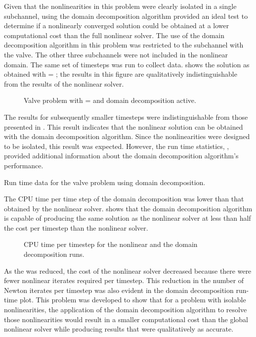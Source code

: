 Given that the nonlinearities in this problem were clearly isolated in a single subchannel, using the domain decomposition algorithm provided an ideal test to determine if a nonlinearly converged solution could be obtained at a lower computational cost than the full nonlinear solver.
The use of the domain decomposition algorithm in this problem was restricted to the subchannel with the valve.
The other three subchannels were not included in the nonlinear domain.
The same set of timesteps was run to collect data.
 shows the solution as obtained with \dtmax{} = ; the results in this figure are qualitatively indistinguishable from the results of the nonlinear solver.

\begin{figure}[h!tb]
\centering

\caption{Valve problem with \dtmax{} =  and domain decomposition active.}
\label{fig:valveDom6pt25em02}
\end{figure}

The results for subsequently smaller timesteps were indistinguishable from those presented in .
This result indicates that the nonlinear solution can be obtained with the domain decomposition algorithm.
Since the nonlinearities were designed to be isolated, this result was expected.
However, the run time statistics, , provided additional information about the domain decomposition algorithm's performance.

\begin{table}[h!tb]
\centering
\singlespace

\caption{Run time data for the valve problem using domain decomposition.}
\label{tab:valveDomTable}
\end{table}

The CPU time per time step of the domain decomposition was lower than that obtained by the nonlinear solver.
 shows that the domain decomposition algorithm is capable of producing the same solution as the nonlinear solver at less than half the cost per timestep than the nonlinear solver.

\begin{figure}[h!tb]
\centering

\caption{CPU time per timestep for the nonlinear and the domain decomposition runs.}
\label{fig:valveRunTime}
\end{figure}

As the \dtmax{} was reduced, the cost of the nonlinear solver decreased because there were fewer nonlinear iterates required per timestep.
This reduction in the number of Newton iterates per timestep was also evident in the domain decomposition run-time plot.
This problem was developed to show that for a problem with isolable nonlinearities, the application of the domain decomposition algorithm to resolve those nonlinearities would result in a smaller computational cost than the global nonlinear solver while producing results that were qualitatively as accurate.

